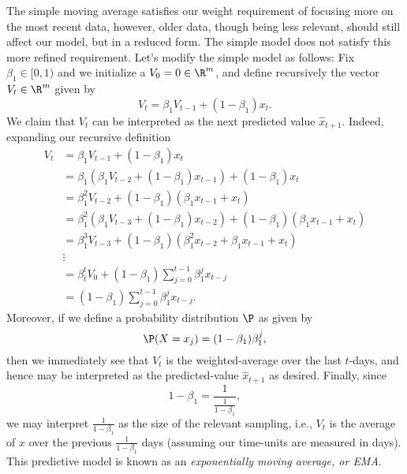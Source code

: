 The simple moving average satisfies our weight requirement of focusing more on the most recent data, however, older data, though being less relevant, should still affect our model, but in a reduced form.  The simple model does not satisfy this more refined requirement.  Let's modify the simple model as follows:  Fix $\beta_1\in[0,1)$ and we initialize a $V_0=0\in\R^m$, and define recursively the vector $V_t\in\R^m$ given by
$$V_t=\beta_1V_{t-1}+(1-\beta_1)x_t.$$
We claim that $V_t$ can be interpreted as the next predicted value $\hat{x}_{t+1}$.  Indeed, expanding our recursive definition
\begin{align*}
	V_t&=\beta_1V_{t-1}+(1-\beta_1)x_t\\
	&=\beta_1(\beta_1V_{t-2}+(1-\beta_1)x_{t-1})+(1-\beta_1)x_t\\
	&=\beta_1^2V_{t-2}+(1-\beta_1)(\beta_1x_{t-1}+x_t)\\
	&=\beta_1^2(\beta_1V_{t-3}+(1-\beta_1)x_{t-2})+(1-\beta_1)(\beta_1x_{t-1}+x_t)\\
	&=\beta_1^3V_{t-3}+(1-\beta_1)(\beta_1^2x_{t-2}+\beta_1x_{t-1}+x_t)\\
	&\vdots\\
	&=\beta_t^tV_0+(1-\beta_1)\sum_{j=0}^{t-1}\beta_1^jx_{t-j}\\
	&=(1-\beta_1)\sum_{j=0}^{t-1}\beta_1^jx_{t-j}.
\end{align*}
Moreover, if we define a probability distribution $\P$ as given by
$$\P(X=x_j)=(1-\beta_1)\beta_1^j,$$
then we immediately see that $V_t$ is the weighted-average over the last $t$-days, and hence may be interpreted as the predicted-value $\hat{x}_{t+1}$ as desired.  Finally, since
$$1-\beta_1=\frac{1}{\frac{1}{1-\beta_1}},$$
we may interpret $\frac{1}{1-\beta_1}$ as the size of the relevant sampling, i.e., $V_t$ is the average of $x$ over the previous $\frac{1}{1-\beta_1}$ days (assuming our time-units are measured in days).  This predictive model is known as an \textit{exponentially moving average, or EMA}.

